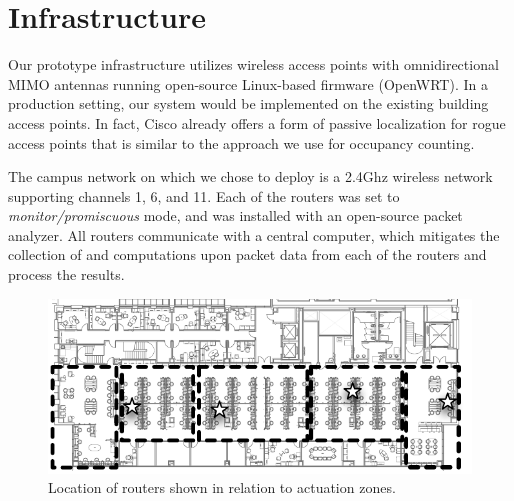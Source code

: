 \section{Infrastructure}
Our prototype infrastructure utilizes wireless access points with omnidirectional MIMO antennas running open-source Linux-based firmware (OpenWRT). In a production setting, our system would be implemented on the existing building access points. In fact, Cisco already offers a form of passive localization for rogue access points that is similar to the approach we use for occupancy counting.

The campus network on which we chose to deploy is a 2.4Ghz wireless network supporting channels 1, 6, and 11. Each of the routers was set to \emph{monitor/promiscuous} mode, and was installed with an open-source packet analyzer. All routers communicate with a central computer, which mitigates the collection of and computations upon packet data from each of the routers and process the results. 

\begin{figure}[htb]
\begin{center}
\includegraphics[width=.8\linewidth]{figs/floormap}
\end{center}
\caption{Location of routers shown in relation to actuation zones.}
\label{fig:floormap}
\end{figure}

